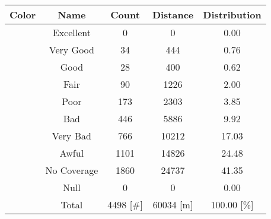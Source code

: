\begin{tabular}{|c|c|c|c|c|}\hline
\rowcolor{Plum!20}
Color&Name&Count&Distance&Distribution\\\hline\hline
\cellcolor[HTML]{00703c} &Excellent&0&0&0.00\\\hline
\cellcolor[HTML]{00a032} &Very Good&34&444&0.76\\\hline
\cellcolor[HTML]{00d228} &Good&28&400&0.62\\\hline
\cellcolor[HTML]{ffff00} &Fair&90&1226&2.00\\\hline
\cellcolor[HTML]{ffaa00} &Poor&173&2303&3.85\\\hline
\cellcolor[HTML]{fa6400} &Bad&446&5886&9.92\\\hline
\cellcolor[HTML]{dc143c} &Very Bad&766&10212&17.03\\\hline
\cellcolor[HTML]{820000} &Awful&1101&14826&24.48\\\hline
\cellcolor[HTML]{aaaaaa} &No Coverage&1860&24737&41.35\\\hline
\cellcolor[HTML]{000000} &Null&0&0&0.00\\\hline
\cellcolor[HTML]{ffffff} &Total&4498 [\#]&60034 [m]&100.00 [\%]\\\hline
\end{tabular}
